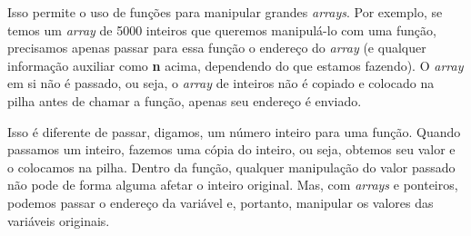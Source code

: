 Isso permite o uso de funções para manipular grandes \textit{arrays}. Por exemplo, se temos um \textit{array} de 5000 inteiros que queremos manipulá-lo com uma função, precisamos apenas passar para essa função o endereço do \textit{array} (e qualquer informação auxiliar como \textbf{n} acima, dependendo do que estamos fazendo). O \textit{array} em si não é passado, ou seja, o \textit{array} de inteiros não é copiado e colocado na pilha antes de chamar a função, apenas seu endereço é enviado.

Isso é diferente de passar, digamos, um número inteiro para uma função. Quando passamos um inteiro, fazemos uma cópia do inteiro, ou seja, obtemos seu valor e o colocamos na pilha. Dentro da função, qualquer manipulação do valor passado não pode de forma alguma afetar o inteiro original. Mas, com \textit{arrays} e ponteiros, podemos passar o endereço da variável e, portanto, manipular os valores das variáveis originais.

